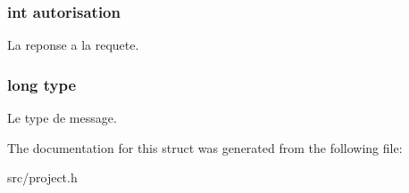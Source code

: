 \subsubsection[{autorisation}]{\setlength{\rightskip}{0pt plus 5cm}int autorisation}\label{struct_reponse_a9ae59baa7d0f7ac15cc2090faf0b5b43}
La reponse a la requete. \hypertarget{struct_reponse_a6a83a8677f7c78fd146859325e08209a}{}
\subsubsection[{type}]{\setlength{\rightskip}{0pt plus 5cm}long type}\label{struct_reponse_a6a83a8677f7c78fd146859325e08209a}
Le type de message. 

The documentation for this struct was generated from the following file\+:\begin{DoxyCompactItemize}
\item 
src/project.\+h\end{DoxyCompactItemize}
